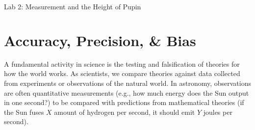 \documentclass[12pt]{article}%
\newcommand{\labnumber}{2}  %
\begin{document}
\thispagestyle{empty}
 \begin{center}
\LARGE Lab \labnumber: Measurement and the Height of Pupin
\end{center}






\section{Accuracy, Precision, \& Bias}

A fundamental activity in science is the testing and falsification of
theories for how the world works. As scientists, we compare theories against data collected from experiments or
observations of the natural world.
In astronomy, observations are often quantitative measurements (e.g., how much
energy does the Sun output in one second?) to be compared with predictions from
mathematical theories (if the Sun fuses $X$ amount of hydrogen per second,
it should emit $Y$ joules per second).
\end{document}
